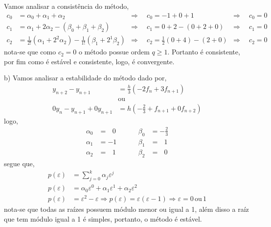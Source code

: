 \documentclass[a4paper,12pt]{article}
\begin{document}
Vamos analisar a consist\^encia do m\'etodo,
	\begin{align*}
		c_{0} &= \alpha_{0} + \alpha_{1} + \alpha_{2} &\Rightarrow \hspace{6pt} &c_{0} = -1 + 0 + 1 &\Rightarrow
		\hspace{2pt} &c_{0} =
		0\\
		c_{1} &= \alpha_{1} + 2\alpha_{2} -(\beta_{0} + \beta_{1} + \beta_{2}) &\Rightarrow \hspace{6pt} &c_{1} = 0 +
		2 - (0 + 2 + 0) &\Rightarrow \hspace{2pt} &c_{1} = 0\\
		c_{2} &= \frac{1}{2!}(\alpha_{1} + 2^{2}\alpha_{2}) - \frac{1}{1!}(\beta_{1} + 2^{1}\beta_{2}) &\Rightarrow
		\hspace{6pt} &c_{2} = \frac{1}{2}(0 + 4)-(2 + 0) &\Rightarrow \hspace{6pt} &c_{2} = 0 
	\end{align*}
nota-se que como $c_{2} = 0$ o m\'etodo possue ordem $q \geq 1$. Portanto \'e consistente, por fim como \'e est\'avel e
consistente, logo, \'e convergente.

b) Vamos analisar a estabilidade do m\'etodo dado por,
	\begin{align*}
		y_{n+2} - y_{n+1} &= \frac{h}{3}(-2f_{n} + 3f_{n+1})\\
		&\mbox{ou}\\
		0y_{n} - y_{n+1} + 0y_{n+1} &= h(-\frac{2}{3} + f_{n+1} + 0f_{n+2})
	\end{align*}
logo,
	\begin{align*}
		\alpha_{0} &=\hspace{8pt} 0 \hspace{1cm}& \beta_{0} &= -\frac{2}{3}\\
		\alpha_{1} &= -1 \hspace{1cm}& \beta_{1} &= \hspace{8pt} 1\\
		\alpha_{2} &=\hspace{8pt} 1 \hspace{1cm}& \beta_{2} &= \hspace{8pt} 0
	\end{align*}
segue que,
	\begin{align*}
		p(\varepsilon) &= \sum_{j=0}^{k}\alpha_{j}\varepsilon^{j} \\
		p(\varepsilon) &= \alpha_{0}\varepsilon^{0} + \alpha_{1}\varepsilon^{1} + \alpha_{2}\varepsilon^{2}\\
		p(\varepsilon) &= \varepsilon^{2} -\varepsilon \Rightarrow p(\varepsilon) = \varepsilon(\varepsilon - 1)
		\Rightarrow \varepsilon = 0 \hspace{2pt} \mbox{ou} \hspace{2pt} 1
	\end{align*}
nota-se que todas as ra\'izes possuem m\'odulo menor ou igual a 1, al\'em disso a ra\'iz que tem m\'odulo igual a 1 \'e
simples, portanto, o m\'etodo \'e est\'avel.
\end{document}
